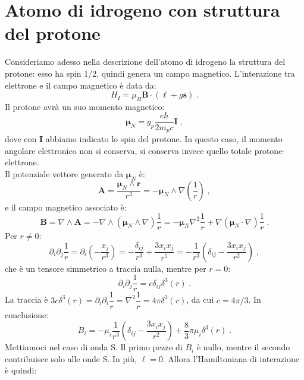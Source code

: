\documentclass[10pt,a4paper]{report}
\theoremstyle{definition}
\numberwithin{equation}{section}
\begin{document}
\section{Atomo di idrogeno con struttura del protone}
Consideriamo adesso nella descrizione dell'atomo di idrogeno la struttura del protone: esso ha spin 1/2, quindi genera un campo magnetico. L'interazione tra elettrone e il campo magnetico è data da:
\begin{equation}
H_I=\mu_B\mathbf{B}\cdot(\boldsymbol{\ell}+g\mathbf{s})\;.
\end{equation}
Il protone avrà un suo momento magnetico:
\begin{equation}
\boldsymbol{\mu}_N=g_p\frac{e\hbar}{2m_pc}\mathbf{I}\;,
\end{equation}
dove con $\mathbf{I}$ abbiamo indicato lo spin del protone. In questo caso, il momento angolare elettronico non si conserva, si conserva invece quello totale protone-elettrone.\\
Il potenziale vettore generato da $\boldsymbol{\mu}_N$ è:
\begin{equation}
\mathbf{A}=\frac{\boldsymbol{\mu}_N\wedge \mathbf{r}}{r^3}=-\boldsymbol{\mu}_N\wedge\nabla\left(\frac{1}{r}\right)\;,
\end{equation}
e il campo magnetico associato è:
\begin{equation}
\mathbf{B}=\nabla\wedge\mathbf{A}=-\nabla\wedge(\boldsymbol{\mu}_N\wedge\nabla)\frac{1}{r}=-\boldsymbol{\mu}_N\nabla^2\frac{1}{r}+\nabla(\boldsymbol{\mu}_N\cdot\nabla)\frac{1}{r}\;.
\end{equation}
Per $r\ne 0$:
\begin{equation}
\partial_i\partial_j\frac{1}{r}=\partial_i\left(-\frac{x_j}{r^3}\right)=-\frac{\delta_{ij}}{r^3}+\frac{3x_ix_j}{r^5}=-\frac{1}{r^3}\left(\delta_{ij}-\frac{3x_ix_j}{r^2}\right)\;,
\end{equation}
che è un tensore simmetrico a traccia nulla, mentre per $r=0$:
\begin{equation}
\partial_i\partial_j\frac{1}{r}=c\delta_{ij}\delta^3(r)\;.
\end{equation}
La traccia è $3c\delta^3(r)=\partial_i\partial_i\dfrac{1}{r}=\nabla^2\dfrac{1}{r}=4\pi\delta^3(r)$, da cui $c=4\pi/3$. In conclusione:
\begin{equation}
B_i=-\mu_i\frac{1}{r^3}\left(\delta_{ij}-\frac{3x_ix_j}{r^2}\right)+\frac{8}{3}\pi\mu_i\delta^3(r)\;.
\end{equation}
Mettiamoci nel caso di onda S. Il primo pezzo di $B_i$ è nullo, mentre il secondo contribuisce solo alle onde S. In più, $\boldsymbol{\ell}=0$. Allora l'Hamiltoniana di interazione è quindi:
\end{document}
